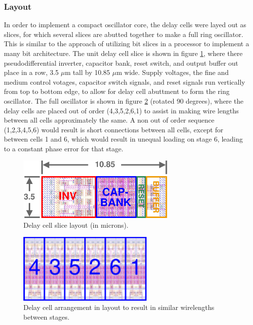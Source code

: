 		\subsubsection{Layout}
		In order to implement a compact oscillator core, the delay cells were layed out as slices, for which several slices are abutted together to make a full ring oscillator. This is similar to the approach of utilizing bit slices in a processor to implement a many bit architecture. The unit delay cell slice is shown in figure \ref{fig:ro_slice}, where there pseudodifferential inverter, capacitor bank, reset switch, and output buffer out place in a row, 3.5 $\mu$m tall by 10.85 $\mu$m wide. Supply voltages, the fine and medium control votages, capacitor switch signals, and reset signals run vertically from top to bottom edge, to allow for delay cell abuttment to form the ring oscillator. The full oscillator is shown in figure \ref{fig:slice_order} (rotated 90 degrees), where the delay cells are placed out of order (4,3,5,2,6,1) to assist in making wire lengths between all cells approximately the same. A non out of order sequence (1,2,3,4,5,6) would result is short connections between all cells, except for between cells 1 and 6, which would result in unequal loading on stage 6, leading to a constant phase error for that stage.

			\begin{figure}[htb!]
			        \centering
			        \includegraphics[width=0.7\textwidth, angle=00]{./figs/design/ro_slice}
			    \caption{Delay cell slice layout (in microns).}
			    \label{fig:ro_slice}
			\end{figure}

			\begin{figure}[htb!]
			        \centering
			        \includegraphics[width=0.6\textwidth, angle=00]{./figs/design/slice_order}
			    \caption{Delay cell arrangement in layout to result in similar wirelengths between stages.}
			    \label{fig:slice_order}
			\end{figure}

